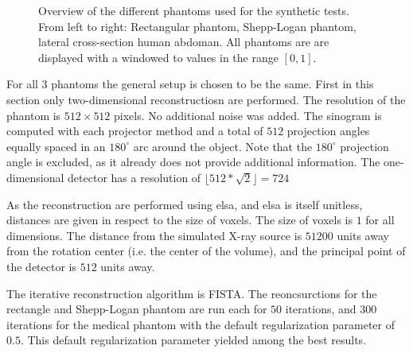 \begin{figure}
	\centering
	\caption{Overview of the different phantoms used for the synthetic tests. From left to
		right: Rectangular phantom, Shepp-Logan phantom, lateral cross-section human
		abdoman. All phantoms are are displayed with a windowed to values in the range \([0,
				1]\).}\label{fig:experiment_overview_phantoms}
\end{figure}

For all 3 phantoms the general setup is chosen to be the same. First in this section only
two-dimensional reconstructiosn are performed. The resolution of the phantom is \(512 \times 512\)
pixels. No additional noise was added. The sinogram is computed with each projector method and a
total of \(512\) projection angles equally spaced in an \(180^\circ\) arc around the object. Note
that the \(180^\circ\) projection angle is excluded, as it already does not provide additional
information. The one-dimensional detector has a resolution of \(\lfloor 512 * \sqrt{2} \rfloor =
724\)

As the reconstruction are performed using elsa, and elsa is itself unitless, distances are given in
respect to the size of voxels.   The size of voxels is \(1\) for all
dimensions. The distance from the simulated X-ray source is \(51200\) units away from the rotation
center (i.e. the center of the volume), and the principal point of the detector is \(512\) units
away.

The iterative reconstruction algorithm is \gls{FISTA}. The reoncsurctions for the rectangle and
Shepp-Logan phantom are run each for \(50\) iterations, and \(300\) iterations for the medical
phantom with the default regularization parameter of \(0.5\). This default regularization parameter
yielded among the best results.

